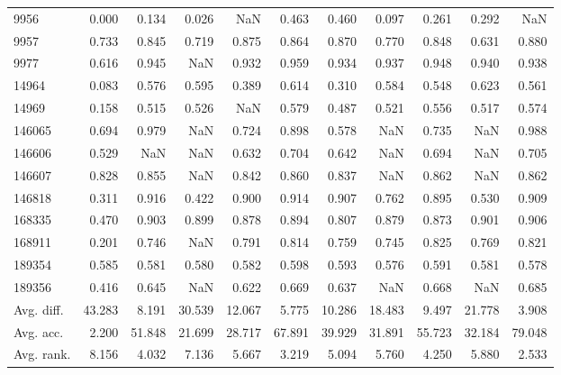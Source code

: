 \begin{tabular}{lrrrrrrrrrr}
9956 & 0.000 & 0.134 & 0.026 & NaN & 0.463 & 0.460 & 0.097 & 0.261 & 0.292 & NaN \\
9957 & 0.733 & 0.845 & 0.719 & 0.875 & 0.864 & 0.870 & 0.770 & 0.848 & 0.631 & 0.880 \\
9977 & 0.616 & 0.945 & NaN & 0.932 & 0.959 & 0.934 & 0.937 & 0.948 & 0.940 & 0.938 \\
14964 & 0.083 & 0.576 & 0.595 & 0.389 & 0.614 & 0.310 & 0.584 & 0.548 & 0.623 & 0.561 \\
14969 & 0.158 & 0.515 & 0.526 & NaN & 0.579 & 0.487 & 0.521 & 0.556 & 0.517 & 0.574 \\
146065 & 0.694 & 0.979 & NaN & 0.724 & 0.898 & 0.578 & NaN & 0.735 & NaN & 0.988 \\
146606 & 0.529 & NaN & NaN & 0.632 & 0.704 & 0.642 & NaN & 0.694 & NaN & 0.705 \\
146607 & 0.828 & 0.855 & NaN & 0.842 & 0.860 & 0.837 & NaN & 0.862 & NaN & 0.862 \\
146818 & 0.311 & 0.916 & 0.422 & 0.900 & 0.914 & 0.907 & 0.762 & 0.895 & 0.530 & 0.909 \\
168335 & 0.470 & 0.903 & 0.899 & 0.878 & 0.894 & 0.807 & 0.879 & 0.873 & 0.901 & 0.906 \\
168911 & 0.201 & 0.746 & NaN & 0.791 & 0.814 & 0.759 & 0.745 & 0.825 & 0.769 & 0.821 \\
189354 & 0.585 & 0.581 & 0.580 & 0.582 & 0.598 & 0.593 & 0.576 & 0.591 & 0.581 & 0.578 \\
189356 & 0.416 & 0.645 & NaN & 0.622 & 0.669 & 0.637 & NaN & 0.668 & NaN & 0.685 \\
Avg. diff. & 43.283 & 8.191 & 30.539 & 12.067 & 5.775 & 10.286 & 18.483 & 9.497 & 21.778 & 3.908 \\
Avg. acc. & 2.200 & 51.848 & 21.699 & 28.717 & 67.891 & 39.929 & 31.891 & 55.723 & 32.184 & 79.048 \\
Avg. rank. & 8.156 & 4.032 & 7.136 & 5.667 & 3.219 & 5.094 & 5.760 & 4.250 & 5.880 & 2.533 \\
\bottomrule
\end{tabular}
